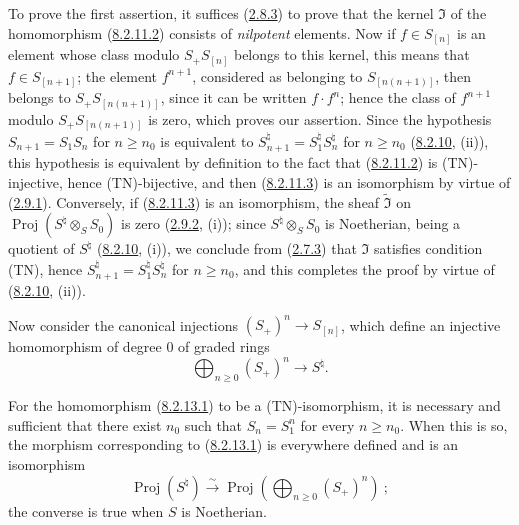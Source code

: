 To prove the first assertion, it suffices
(\hyperref[II.2.8.3]{2.8.3}) to prove that the kernel $\mathfrak{I}$ of
the homomorphism (\hyperref[II.8.2.11.2]{8.2.11.2}) consists of
\emph{nilpotent} elements. Now if $f\in S_{[n]}$ is an element whose class modulo
$S_+S_{[n]}$ belongs to this kernel, this means that $f\in S_{[n+1]}$;
the element $f^{n+1}$, considered as belonging to $S_{[n(n+1)]}$, then
belongs to $S_+S_{[n(n+1)]}$, since it can be written $f\cdot f^n$; hence the class of
$f^{n+1}$ modulo $S_+S_{[n(n+1)]}$ is zero, which proves our assertion.
Since the hypothesis $S_{n+1}=S_1S_n$ for $n\geq n_0$ is equivalent to
$S_{n+1}^{\natural}=S_1^{\natural}S_n^{\natural}$ for $n\geq n_0$
(\hyperref[II.8.2.10]{8.2.10}, (ii)), this hypothesis is equivalent by definition
to the fact that (\hyperref[II.8.2.11.2]{8.2.11.2}) is (TN)-injective, hence
(TN)-bijective, and then (\hyperref[II.8.2.11.3]{8.2.11.3}) is an
isomorphism by virtue of (\hyperref[II.2.9.1]{2.9.1}). Conversely, if
(\hyperref[II.8.2.11.3]{8.2.11.3}) is an isomorphism, the sheaf
$\widetilde{\mathfrak{I}}$ on
$\operatorname{Proj}(S^{\natural}\otimes_S S_0)$ is zero
(\hyperref[II.2.9.2]{2.9.2}, (i)); since
$S^{\natural}\otimes_S S_0$ is Noetherian, being a quotient of $S^{\natural}$
(\hyperref[II.8.2.10]{8.2.10}, (i)), we conclude from
(\hyperref[II.2.7.3]{2.7.3}) that $\mathfrak{I}$ satisfies condition (TN),
hence $S_{n+1}^{\natural}=S_1^{\natural}S_n^{\natural}$ for $n\geq n_0$, and
this completes the proof by virtue of
(\hyperref[II.8.2.10]{8.2.10}, (ii)).

\begin{env}[8.2.13]
\label{II.8.2.13}
Now consider the canonical injections $(S_+)^n\to S_{[n]}$, which
define an injective homomorphism of degree $0$ of graded rings
\begin{equation}
\label{II.8.2.13.1}
  \bigoplus_{n\geq0}(S_+)^n\to S^{\natural}.
\tag{8.2.13.1}
\end{equation}
\end{env}

\begin{proposition}[8.2.14]
\label{II.8.2.14}
For the homomorphism (\hyperref[II.8.2.13.1]{8.2.13.1}) to be a
(TN)-isomorphism, it is necessary and sufficient that there exist $n_0$ such that
$S_n=S_1^n$ for every $n\geq n_0$. When this is so, the morphism
corresponding to (\hyperref[II.8.2.13.1]{8.2.13.1}) is everywhere defined and
is an isomorphism
\[
  \operatorname{Proj}(S^{\natural})\xrightarrow{\sim}
  \operatorname{Proj}\left(\bigoplus_{n\geq0}(S_+)^n\right)~;
\]
the converse is true when $S$ is Noetherian.
\end{proposition}

